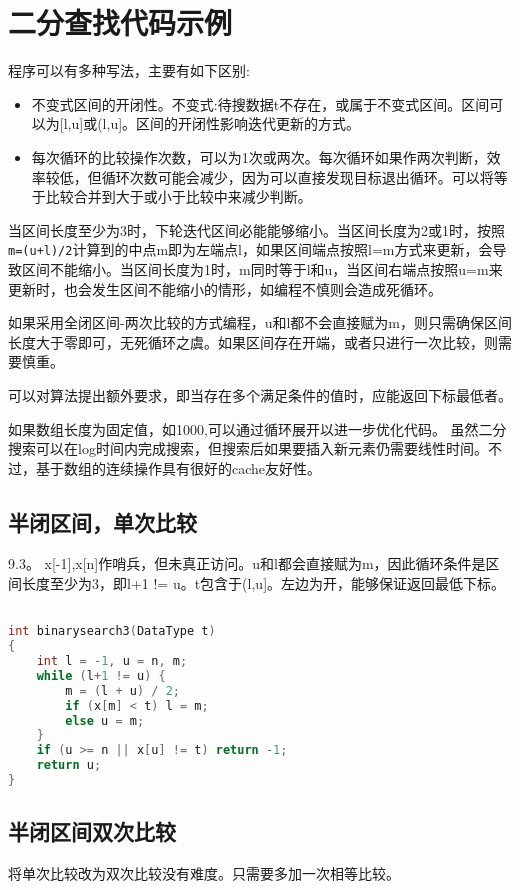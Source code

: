 \section{二分查找代码示例}

程序可以有多种写法，主要有如下区别:
\begin{itemize}
    \item 不变式区间的开闭性。不变式:待搜数据t不存在，或属于不变式区间。区间可以为[l,u]或(l,u]。区间的开闭性影响迭代更新的方式。
    \item 每次循环的比较操作次数，可以为1次或两次。每次循环如果作两次判断，效率较低，但循环次数可能会减少，因为可以直接发现目标退出循环。可以将等于比较合并到大于或小于比较中来减少判断。
\end{itemize}


当区间长度至少为3时，下轮迭代区间必能能够缩小。当区间长度为2或1时，按照\verb|m=(u+l)/2|计算到的中点m即为左端点l，如果区间端点按照l=m方式来更新，会导致区间不能缩小。当区间长度为1时，m同时等于l和u，当区间右端点按照u=m来更新时，也会发生区间不能缩小的情形，如编程不慎则会造成死循环。

如果采用全闭区间-两次比较的方式编程，u和l都不会直接赋为m，则只需确保区间长度大于零即可，无死循环之虞。如果区间存在开端，或者只进行一次比较，则需要慎重。

可以对算法提出额外要求，即当存在多个满足条件的值时，应能返回下标最低者。

如果数组长度为固定值，如1000,可以通过循环展开以进一步优化代码。
虽然二分搜索可以在log时间内完成搜索，但搜索后如果要插入新元素仍需要线性时间。不过，基于数组的连续操作具有很好的cache友好性。

\subsection{半闭区间，单次比较}
\cite{pp}9.3。 x[-1],x[n]作哨兵，但未真正访问。u和l都会直接赋为m，因此循环条件是区间长度至少为3，即l+1 != u。t包含于(l,u]。左边为开，能够保证返回最低下标。
\label{codes:binsort}

\begin{lstlisting}[language=C]

int binarysearch3(DataType t)
{	
	int l = -1, u = n, m;
	while (l+1 != u) {
		m = (l + u) / 2;
		if (x[m] < t) l = m;
		else u = m;
	}
	if (u >= n || x[u] != t) return -1;
	return u;
}
\end{lstlisting}

\subsection{半闭区间双次比较}
将单次比较改为双次比较没有难度。只需要多加一次相等比较。

